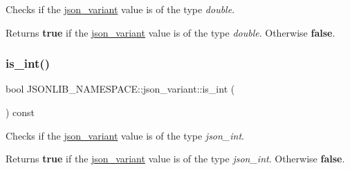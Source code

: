 Checks if the \hyperlink{classJSONLIB__NAMESPACE_1_1json__variant}{json\+\_\+variant} value is of the type {\itshape double}. 

\begin{DoxyReturn}{Returns}
{\bfseries true} if the \hyperlink{classJSONLIB__NAMESPACE_1_1json__variant}{json\+\_\+variant} value is of the type {\itshape double}. Otherwise {\bfseries false}. 
\end{DoxyReturn}
\mbox{\label{classJSONLIB__NAMESPACE_1_1json__variant_a2d6f7d2f92f5c3bfaf9c548a783a97fb}} 
\subsubsection{\texorpdfstring{is\+\_\+int()}{is\_int()}}
{\footnotesize\ttfamily bool J\+S\+O\+N\+L\+I\+B\+\_\+\+N\+A\+M\+E\+S\+P\+A\+C\+E\+::json\+\_\+variant\+::is\+\_\+int (\begin{DoxyParamCaption}{ }\end{DoxyParamCaption}) const}



Checks if the \hyperlink{classJSONLIB__NAMESPACE_1_1json__variant}{json\+\_\+variant} value is of the type {\itshape json\+\_\+int}. 

\begin{DoxyReturn}{Returns}
{\bfseries true} if the \hyperlink{classJSONLIB__NAMESPACE_1_1json__variant}{json\+\_\+variant} value is of the type {\itshape json\+\_\+int}. Otherwise {\bfseries false}. 
\end{DoxyReturn}
\mbox{\label{classJSONLIB__NAMESPACE_1_1json__variant_a1a08b35da4cf3a334d32ebb81b20c08a}} 
